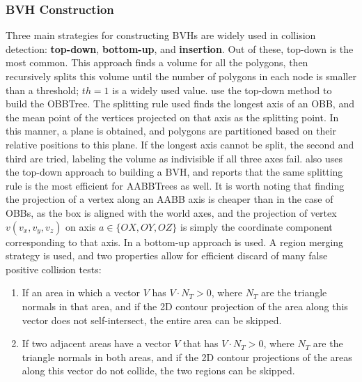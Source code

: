 \subsubsection{BVH Construction}
\label{sub-sub-sec:bvhconstruction}

Three main strategies for constructing BVHs are widely used in collision detection: \textbf{top-down}, \textbf{bottom-up}, and \textbf{insertion}. Out of these, top-down is the most common. This approach finds a volume for all the polygons, then recursively splits this volume until the number of polygons in each node is smaller than a threshold; $th = 1$ is a widely used value. \citep{gott96} use the top-down method to build the OBBTree. The splitting rule used finds the longest axis of an OBB, and the mean point of the vertices projected on that axis as the splitting point. In this manner, a plane is obtained, and polygons are partitioned based on their relative positions to this plane. If the longest axis cannot be split, the second and third are tried, labeling the volume as indivisible if all three axes fail. \citep{vdb97} also uses the top-down approach to building a BVH, and reports that the same splitting rule is the most efficient for AABBTrees as well. It is worth noting that finding the projection of a vertex along an AABB axis is cheaper than in the case of OBBs, as the box is aligned with the world axes, and the projection of vertex $v(v_{x}, v_{y}, v_{z})$ on axis $a \in \{OX, OY, OZ\}$ is simply the coordinate component corresponding to that axis. In \citep{vmt95} a bottom-up approach is used. A region merging strategy is used, and two properties allow for efficient discard of many false positive collision tests:

\begin{enumerate}
	\item \label{prop:sc1} If an area in which a vector $V$ has $V \cdot N_{T} > 0$, where $N_{T}$ are the triangle normals in that area, and if the 2D contour projection of the area along this vector does not self-intersect, the entire area can be skipped.

	\item \label{prop:sc2} If two adjacent areas have a vector $V$ that has $V \cdot N_{T} > 0$, where $N_{T}$ are the triangle normals in both areas, and if the 2D contour projections of the areas along this vector do not collide, the two regions can be skipped.
\end{enumerate}

